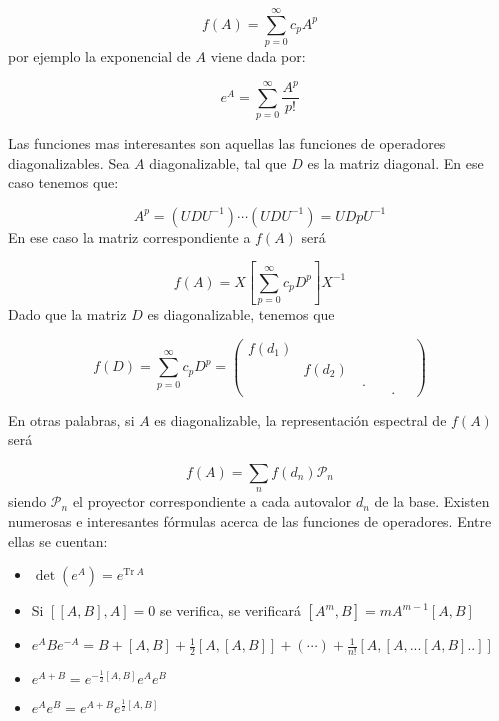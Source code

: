 \documentclass[12pt]{book}
\numberwithin{equation}{chapter}
\numberwithin{figure}{chapter}
\newcommand{\ccorchetes}[1]{\left[ #1  \right]}
\newcommand{\Tr}{\mathrm{Tr} \ }
\begin{document}
\begin{equation}
f(A) = \sum_{p=0}^\infty c_p A^p
\end{equation}
por ejemplo la exponencial de $A$ viene dada por:

\begin{equation}
e^A = \sum_{p=0}^\infty \frac{A^p}{p!}
\end{equation}

Las funciones mas interesantes son aquellas  las funciones de operadores diagonalizables. Sea $A$ diagonalizable, tal que $D$ es la matriz diagonal. En ese caso tenemos que:

\begin{equation}
A^p = (U D U^{-1}) \cdots (U D U^{-1}) = U Dp U^{-1}
\end{equation}
En ese caso la matriz correspondiente a $f(A)$ será

\begin{equation}
f(A) = X \ccorchetes{ \sum_{p=0}^\infty c_p D^p } X^{-1}
\end{equation}
Dado que la matriz $D$ es diagonalizable, tenemos que

\begin{equation}
f(D) = \sum_ {p = 0}^\infty c_p D^p = \begin{pmatrix}
f(d_1) & & & \\
 & f(d_2) & & \\
 & & \ . \quad & \\
 & & & . \quad 
\end{pmatrix}
\end{equation}

En otras palabras, si $A$ es diagonalizable, la representación espectral de $f(A)$ será 

\begin{equation}
f(A) = \sum_n f(d_n) \mathcal{P}_n
\end{equation}
siendo $\mathcal{P}_n$ el proyector correspondiente a cada autovalor $d_n$ de la base. Existen numerosas e interesantes fórmulas acerca de las funciones de operadores. Entre ellas se cuentan:

\begin{itemize}
\item $ \det (e^A) = e^{\Tr A} $
\item Si $[[A,B],A]=0$ se verifica, se verificará $ [A^m,B] = m A^{m-1} [A,B] $
\item $ e^{A}Be^{-A} = B+[A,B]+ \frac{1}{2} [A,[A,B]] + (\cdots) + \frac{1}{n!} [A,[A,...[A,B]..]] $
\item $e^{A+B}=e^{-\frac{1}{2}[A,B]} e^{A} e^{B}$
\item $e^A e^B = e^{A+B} e^{\frac{1}{2}[A,B]}$
\end{itemize}
\end{document}
